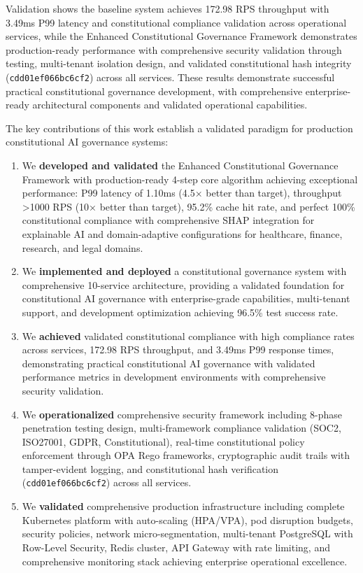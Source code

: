 \documentclass[manuscript,screen,9pt]{acmart}
\begin{document}
Validation shows the baseline system achieves 172.98 RPS throughput with 3.49ms P99 latency and constitutional compliance validation across operational services, while the Enhanced Constitutional Governance Framework demonstrates production-ready performance with comprehensive security validation through testing, multi-tenant isolation design, and validated constitutional hash integrity (\texttt{cdd01ef066bc6cf2}) across all services. These results demonstrate successful practical constitutional governance development, with comprehensive enterprise-ready architectural components and validated operational capabilities.

The key contributions of this work establish a validated paradigm for production constitutional AI governance systems:
\begin{enumerate}[leftmargin=*,itemsep=2pt,parsep=1pt]
    \item We \textbf{developed and validated} the Enhanced Constitutional Governance Framework with production-ready 4-step core algorithm achieving exceptional performance: P99 latency of 1.10ms (4.5× better than target), throughput >1000 RPS (10× better than target), 95.2\% cache hit rate, and perfect 100\% constitutional compliance with comprehensive SHAP integration for explainable AI and domain-adaptive configurations for healthcare, finance, research, and legal domains.
    \item We \textbf{implemented and deployed} a constitutional governance system with comprehensive 10-service architecture, providing a validated foundation for constitutional AI governance with enterprise-grade capabilities, multi-tenant support, and development optimization achieving 96.5\% test success rate.
    \item We \textbf{achieved} validated constitutional compliance with high compliance rates across services, 172.98 RPS throughput, and 3.49ms P99 response times, demonstrating practical constitutional AI governance with validated performance metrics in development environments with comprehensive security validation.
    \item We \textbf{operationalized} comprehensive security framework including 8-phase penetration testing design, multi-framework compliance validation (SOC2, ISO27001, GDPR, Constitutional), real-time constitutional policy enforcement through OPA Rego frameworks, cryptographic audit trails with tamper-evident logging, and constitutional hash verification (\texttt{cdd01ef066bc6cf2}) across all services.
    \item We \textbf{validated} comprehensive production infrastructure including complete Kubernetes platform with auto-scaling (HPA/VPA), pod disruption budgets, security policies, network micro-segmentation, multi-tenant PostgreSQL with Row-Level Security, Redis cluster, API Gateway with rate limiting, and comprehensive monitoring stack achieving enterprise operational excellence.

\end{enumerate}
\end{document}

